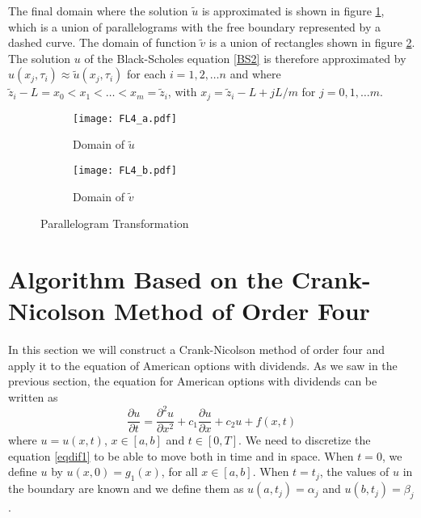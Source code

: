 \documentclass[00main.tex]{subfiles}
\begin{document}
The final domain where the solution $\tilde{u}$ is approximated is shown in figure \ref{Fig4a}, which is a union of parallelograms with the free boundary represented by a dashed curve. The domain of function $\tilde{v}$ is a union of rectangles shown in figure \ref{Fig4b}.  The solution $u$ of the Black-Scholes equation \eqref{BS2} is therefore approximated by $u(x_ j,\tau_i)\approx \tilde{u}(x_j,\tau_i)$ for each $i=1,2,\hdots n$ and where $\tilde{z}_{i}-L=x_0<x_1<\hdots <x_m= \tilde{z}_{i}$, with $x_j=\tilde{z}_{i}-L+jL/m$ for $j=0,1,\hdots m$.

\begin{figure}
\centering 
\begin{subfigure}{.45\textwidth}
\texttt{[image: FL4\_a.pdf]}
\caption{Domain of $\tilde{u}$}
\label{Fig4a}
\end{subfigure}
\begin{subfigure}{.45\textwidth}
\texttt{[image: FL4\_b.pdf]}
\caption{Domain of $\tilde{v}$}
\label{Fig4b}
\end{subfigure}
\caption{Parallelogram Transformation}
\label{Fig4}
\end{figure}  








\section{Algorithm Based on the Crank-Nicolson Method of Order Four}





In this section we will construct a Crank-Nicolson method of order four and apply it to the equation of American options with dividends. As we saw in the previous section, the equation for American options with dividends can be written as \begin{equation}
\frac{\partial u}{\partial t} = \frac{\partial^2 u}{\partial x^2} + c_1 \frac{\partial u}{\partial x} +c_2 u + f(x,t)
\label{eqdif1}
\end{equation} where $u =u(x,t)$, $x \in [ a,b]$ and $t \in [0,T]$. We need to discretize the equation \ref{eqdif1} to be able to move both in time and in space. When $t=0$, we define $u$ by $u(x,0) = g_1(x)$, for all $ x \in [a,b]$. When $t = t_j$, the values of $u$ in the boundary are known and we define them as $u(a,t_j) = \alpha_j$ and $u(b,t_j) = \beta_j$.
\end{document}

